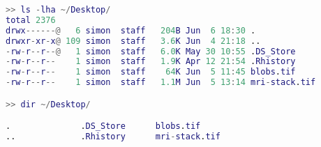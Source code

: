 \begin{lstlisting}[language=matlab]
>> ls -lha ~/Desktop/
total 2376
drwx------@   6 simon  staff   204B Jun  6 18:30 .
drwxr-xr-x@ 109 simon  staff   3.6K Jun  4 21:18 ..
-rw-r--r--@   1 simon  staff   6.0K May 30 10:55 .DS_Store
-rw-r--r--    1 simon  staff   1.9K Apr 12 21:54 .Rhistory
-rw-r--r--    1 simon  staff    64K Jun  5 11:45 blobs.tif
-rw-r--r--    1 simon  staff   1.1M Jun  5 13:14 mri-stack.tif

>> dir ~/Desktop/

.              .DS_Store      blobs.tif      
..             .Rhistory      mri-stack.tif  

\end{lstlisting}